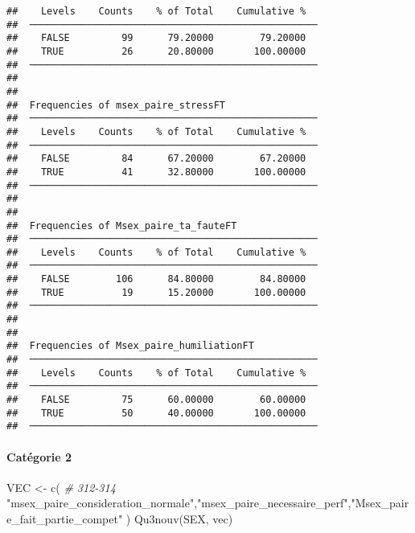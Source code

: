 \documentclass[
]{article}
\newenvironment{Shaded}{\begin{snugshade}}{\end{snugshade}}
\newcommand{\CommentTok}[1]{\textcolor[rgb]{0.56,0.35,0.01}{\textit{#1}}}
\newcommand{\FunctionTok}[1]{\textcolor[rgb]{0.00,0.00,0.00}{#1}}
\newcommand{\NormalTok}[1]{#1}
\newcommand{\OtherTok}[1]{\textcolor[rgb]{0.56,0.35,0.01}{#1}}
\newcommand{\StringTok}[1]{\textcolor[rgb]{0.31,0.60,0.02}{#1}}
\begin{document}
\begin{verbatim}
##    Levels    Counts    % of Total    Cumulative %   
##  ────────────────────────────────────────────────── 
##    FALSE         99      79.20000        79.20000   
##    TRUE          26      20.80000       100.00000   
##  ────────────────────────────────────────────────── 
## 
## 
##  Frequencies of msex_paire_stressFT                 
##  ────────────────────────────────────────────────── 
##    Levels    Counts    % of Total    Cumulative %   
##  ────────────────────────────────────────────────── 
##    FALSE         84      67.20000        67.20000   
##    TRUE          41      32.80000       100.00000   
##  ────────────────────────────────────────────────── 
## 
## 
##  Frequencies of Msex_paire_ta_fauteFT               
##  ────────────────────────────────────────────────── 
##    Levels    Counts    % of Total    Cumulative %   
##  ────────────────────────────────────────────────── 
##    FALSE        106      84.80000        84.80000   
##    TRUE          19      15.20000       100.00000   
##  ────────────────────────────────────────────────── 
## 
## 
##  Frequencies of Msex_paire_humiliationFT            
##  ────────────────────────────────────────────────── 
##    Levels    Counts    % of Total    Cumulative %   
##  ────────────────────────────────────────────────── 
##    FALSE         75      60.00000        60.00000   
##    TRUE          50      40.00000       100.00000   
##  ──────────────────────────────────────────────────
\end{verbatim}

\hypertarget{catuxe9gorie-2-3}{%
\paragraph{Catégorie 2}\label{catuxe9gorie-2-3}}

\begin{Shaded}
\begin{Highlighting}[]
\NormalTok{VEC }\OtherTok{\textless{}{-}} \FunctionTok{c}\NormalTok{(   }\CommentTok{\# 312{-}314}
  \StringTok{"msex\_paire\_consideration\_normale"}\NormalTok{,}\StringTok{"msex\_paire\_necessaire\_perf"}\NormalTok{,}\StringTok{"Msex\_paire\_fait\_partie\_compet"}
\NormalTok{)}
\FunctionTok{Qu3nouv}\NormalTok{(SEX, vec)}
\end{Highlighting}
\end{Shaded}
\end{document}
